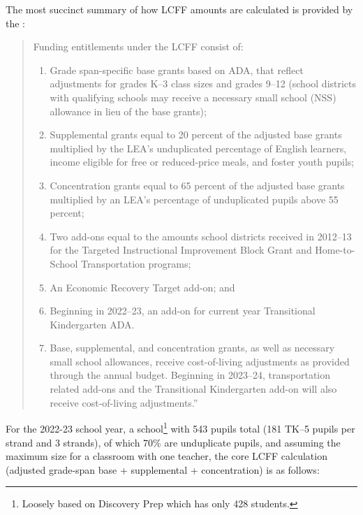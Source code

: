 The most succinct summary of how LCFF amounts are calculated is provided by the \textcite{CDE2023a}:
\begin{quotation}\noindent\SingleSpacing\vspace{-1\baselineskip}
  Funding entitlements under the LCFF consist of:
  \begin{enumerate}
    \item Grade span-specific base grants based on ADA, that reflect adjustments for grades K–3 class sizes and grades 9–12 (school districts with qualifying schools may receive a necessary small school (NSS) allowance in lieu of the base grants);
    \item Supplemental grants equal to 20 percent of the adjusted base grants multiplied by the LEA’s unduplicated percentage of English learners, income eligible for free or reduced-price meals, and foster youth pupils;
    \item Concentration grants equal to 65 percent of the adjusted base grants multiplied by an LEA’s percentage of unduplicated pupils above 55 percent;
    \item Two add-ons equal to the amounts school districts received in 2012–13 for the Targeted Instructional Improvement Block Grant and Home-to-School Transportation programs;
    \item An Economic Recovery Target add-on; and
    \item Beginning in 2022–23, an add-on for current year Transitional Kindergarten ADA.
    \item Base, supplemental, and concentration grants, as well as necessary small school allowances, receive cost-of-living adjustments as provided through the annual budget. Beginning in 2023–24, transportation related add-ons and the Transitional Kindergarten add-on will also receive cost-of-living adjustments.''
  \end{enumerate}
\end{quotation}

For the 2022-23 school year, a school\footnote{Loosely based on Discovery Prep which has only 428 students.} with 543 pupils total (181 TK–5 pupils per strand and 3 strands), of which 70\% are unduplicate pupils, and assuming the maximum size for a classroom with one teacher, the core LCFF calculation (adjusted grade-span base + supplemental + concentration) is as follows:\label{example_LCFF_calculation}\\\bigskip

